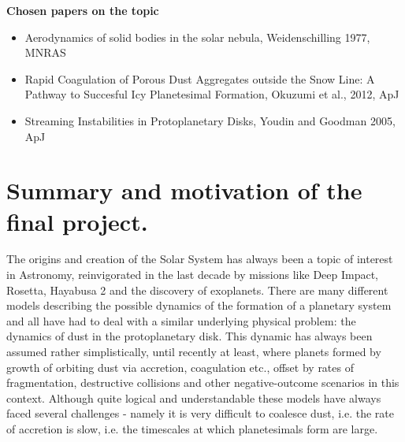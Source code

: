 \documentclass[12pt,letterpaper]{article}
\begin{document}
\textbf{Chosen papers on the topic}
\begin{itemize}
    \item Aerodynamics of solid bodies in the solar nebula, Weidenschilling 1977, MNRAS
    \item Rapid Coagulation of Porous Dust Aggregates outside the Snow Line: A Pathway to Succesful Icy Planetesimal Formation, Okuzumi et al., 2012, ApJ
    \item Streaming Instabilities in Protoplanetary Disks, Youdin and Goodman 2005, ApJ
\end{itemize}


\section*{Summary and motivation of the final project.}

The origins and creation of the Solar System has always been a topic of interest in Astronomy, reinvigorated in the last decade by missions like Deep Impact, Rosetta, Hayabusa 2 and the discovery of exoplanets. There are many different models describing the possible dynamics of the formation of a planetary system and all have had to deal with a similar underlying physical problem: the dynamics of dust in the protoplanetary disk. This dynamic has always been assumed rather simplistically, until recently at least, where planets formed by growth of orbiting dust via accretion, coagulation etc., offset by rates of fragmentation, destructive collisions and other negative-outcome scenarios in this context. Although quite logical and understandable these models have always faced several challenges - namely it is very difficult to coalesce dust, i.e. the rate of accretion is slow, i.e. the timescales at which planetesimals form are large.
\end{document}

